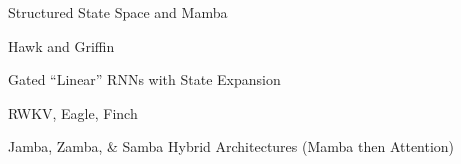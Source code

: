 \begin{slidewhite}[\slideopts, toc={SSM \& Mamba}]{Structured State Space and Mamba}
\vspace{-6em}
\end{slidewhite}

\begin{slidewhite}[\slideopts,toc={Hawk \& Griffin}]{Hawk and Griffin}
\vspace{-6em}
\end{slidewhite}

\begin{slidewhite}[\slideopts,toc={HGRN2}]{Gated ``Linear'' RNNs with State Expansion}
\vspace{-6em}
\end{slidewhite}

\begin{slidewhite}[\slideopts,toc={RWKV+}]{RWKV, Eagle, Finch}
\vspace{-6em}
\end{slidewhite}

\begin{slidewhite}[\slideopts,toc={Hybrid}]{Jamba, Zamba, \& Samba Hybrid Architectures (Mamba then Attention)}
\vspace{-6em}
\end{slidewhite}


%
%
%
%


\endinput
